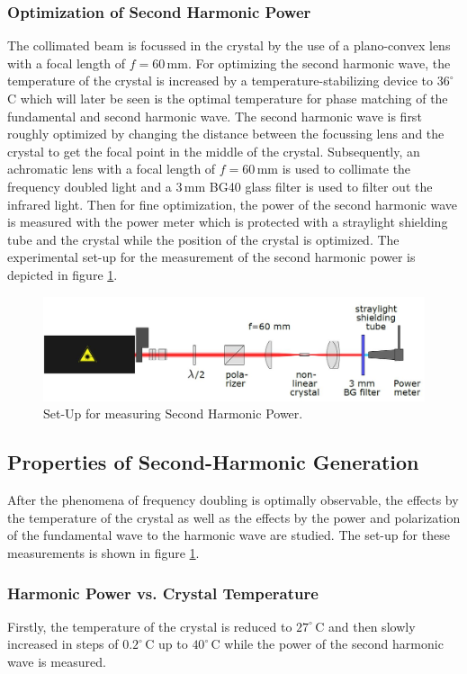 \documentclass[10pt, a4paper, notitlepage, DIV=15]{scrartcl}
\begin{document}
\subsubsection{Optimization of Second Harmonic Power}
The collimated beam is focussed in the crystal by the use of a plano-convex lens with a focal length of $f=60\,$mm. For optimizing the second harmonic wave, the temperature of the crystal is increased by a temperature-stabilizing device to $36^{\circ}\,$C which will later be seen is the optimal temperature for phase matching of the fundamental and second harmonic wave. The second harmonic wave is first roughly optimized by changing the distance between the focussing lens and the crystal to get the focal point in the middle of the crystal. Subsequently, an achromatic lens with a focal length of $f=60\,$mm is used to collimate the frequency doubled light and a $3\,$mm BG40 glass filter is used to filter out the infrared light. Then for fine optimization, the power of the second harmonic wave is measured with the power meter which is protected with a straylight shielding tube and the crystal while the position of the crystal is optimized. The experimental set-up for the measurement of the second harmonic power is depicted in figure \ref{fig:power_sec_harm}.
\begin{figure}[h]
	\centering
	\includegraphics[width=1\textwidth]{power_sec_harm}
	\caption{Set-Up for measuring Second Harmonic Power. \cite{description}}
	\label{fig:power_sec_harm}
\end{figure}
\newline
\subsection{Properties of Second-Harmonic Generation}
After the phenomena of frequency doubling is optimally observable, the effects by the temperature of the crystal as well as the effects by the power and polarization of the fundamental wave to the harmonic wave are studied. The set-up for these measurements is shown in figure \ref{fig:power_sec_harm}.
\subsubsection{Harmonic Power vs. Crystal Temperature}
Firstly, the temperature of the crystal is reduced to $27^{\circ}\,$C and then slowly increased in steps of $0.2^{\circ}\,$C up to $40^{\circ}\,$C while the power of the second harmonic wave is measured.
\end{document}

